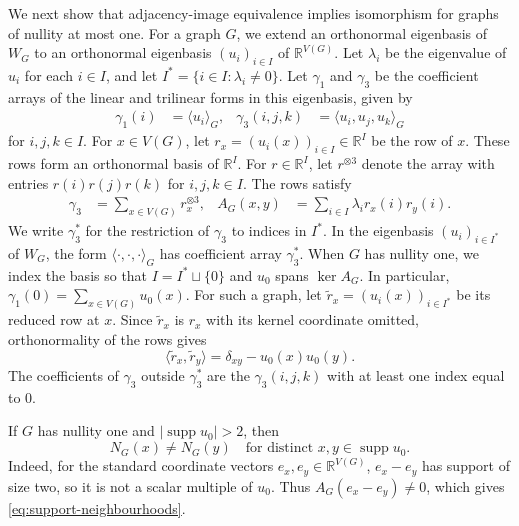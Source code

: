 \documentclass[11pt,a4paper]{article}
\theoremstyle{plain}
\theoremstyle{definition}
\DeclareMathOperator{\supp}{supp}
\newcommand{\R}{\mathbb{R}}
\begin{document}
We next show that adjacency-image equivalence implies isomorphism for
graphs of nullity at most one.
For a graph $G$, we extend an orthonormal eigenbasis of $W_G$ to an
orthonormal eigenbasis $(u_i)_{i\in I}$ of $\R^{V(G)}$.
Let $\lambda_i$ be the eigenvalue of $u_i$ for each $i\in I$,
and let $I^{*}=\{i\in I:\lambda_i\ne0\}$.
Let $\gamma_1$ and $\gamma_3$ be the coefficient arrays of the
linear and trilinear forms in this eigenbasis, given by
\begin{equation}
  \label{eq:tensors}
  \begin{aligned}
  \gamma_1(i)&=\langle u_i\rangle_G, &
  \gamma_3(i,j,k)&=\langle u_i,u_j,u_k\rangle_G
  \end{aligned}
\end{equation}
for $i,j,k\in I$. For $x\in V(G)$, let $r_x=(u_i(x))_{i\in I}\in\R^I$ be
the row of $x$. These rows form an orthonormal basis of $\R^I$.
For $r\in\R^I$, let $r^{\otimes3}$ denote the array with entries
$r(i)r(j)r(k)$ for $i,j,k\in I$.
The rows satisfy
\begin{equation}
  \label{eq:rows}
  \begin{aligned}
  \gamma_3 &= \sum_{x \in V(G)} r_x^{\otimes 3}, &
  A_G(x,y) &= \sum_{i \in I} \lambda_i r_x(i) r_y(i).
  \end{aligned}
\end{equation}
We write $\gamma_3^{*}$ for the restriction of $\gamma_3$ to
indices in $I^{*}$.
In the eigenbasis $(u_i)_{i\in I^*}$ of $W_G$, the form
$\langle\cdot,\cdot,\cdot\rangle_G$ has coefficient array $\gamma_3^*$.
When $G$ has nullity one, we index the basis so that $I=I^*\sqcup\{0\}$
and $u_0$ spans $\ker A_G$.
In particular, $\gamma_1(0)=\sum_{x\in V(G)}u_0(x)$.
For such a graph, let $\tilde{r}_x=(u_i(x))_{i\in I^*}$ be
its reduced row at $x$.
Since $\tilde{r}_x$ is $r_x$ with its kernel coordinate omitted,
orthonormality of the rows gives
\begin{equation}\label{eq:gram}
 \langle\tilde{r}_x,\tilde{r}_y\rangle=\delta_{xy}-u_0(x)u_0(y).
\end{equation}
The coefficients of $\gamma_3$ outside
$\gamma_3^*$ are the $\gamma_3(i,j,k)$ with at least one
index equal to $0$.

If $G$ has nullity one and $|\supp u_0|>2$, then
\begin{equation}\label{eq:support-neighbourhoods}
 N_G(x)\ne N_G(y)\quad\text{for distinct }x,y\in\supp u_0.
\end{equation}
Indeed, for the standard coordinate vectors $e_x,e_y\in\R^{V(G)}$,
$e_x-e_y$ has support of size two, so it is not a scalar multiple of
$u_0$. Thus $A_G(e_x-e_y)\ne0$, which gives
\cref{eq:support-neighbourhoods}.
\end{document}
